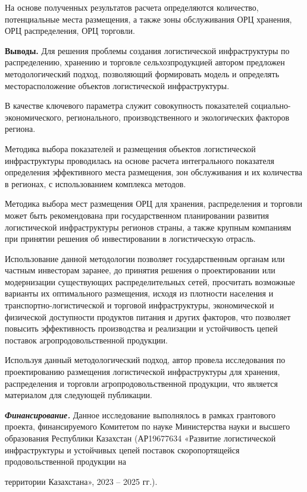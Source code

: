 На основе полученных результатов расчета определяются количество,
потенциальные места размещения, а также зоны обслуживания ОРЦ хранения,
ОРЦ распределения, ОРЦ торговли.

{\bfseries Выводы.} Для решения проблемы создания логистической
инфраструктуры по распределению, хранению и торговле сельхозпродукцией
автором предложен методологический подход, позволяющий формировать
модель и определять месторасположение объектов логистической
инфраструктуры.

В качестве ключевого параметра служит совокупность показателей
социально-экономического, регионального, производственного и
экологических факторов региона.

Методика выбора показателей и размещения объектов логистической
инфраструктуры проводилась на основе расчета интегрального показателя
определения эффективного места размещения, зон обслуживания и их
количества в регионах, с использованием комплекса методов.

Методика выбора мест размещения ОРЦ для хранения, распределения и
торговли может быть рекомендована при государственном планировании
развития логистической инфраструктуры регионов страны, а также крупным
компаниям при принятии решения об инвестировании в логистическую
отрасль.

Использование данной методологии позволяет государственным органам или
частным инвесторам заранее, до принятия решения о проектировании или
модернизации существующих распределительных сетей, просчитать возможные
варианты их оптимального размещения, исходя из плотности населения и
транспортно-логистической и торговой инфраструктуры, экономической и
физической доступности продуктов питания и других факторов, что
позволяет повысить эффективность производства и реализации и
устойчивость цепей поставок агропродовольственной продукции.

Используя данный методологический подход, автор провела исследования по
проектированию размещения логистической инфраструктуры для хранения,
распределения и торговли агропродовольственной продукции, что является
материалом для следующей публикации.

\emph{{\bfseries Финансирование.}} Данное исследование выполнялось в рамках
грантового проекта, финансируемого Комитетом по науке Министерства науки
и высшего образования Республики Казахстан (АР19677634 «Развитие
логистической инфраструктуры и устойчивых цепей поставок скоропортящейся
продовольственной продукции на

территории Казахстана», 2023 -- 2025 гг.).

